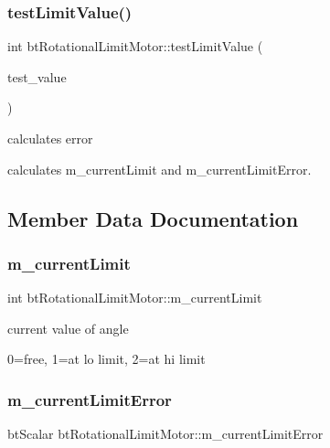 \subsubsection{\texorpdfstring{test\+Limit\+Value()}{testLimitValue()}\hspace{0.1cm}{\footnotesize\ttfamily [2/2]}}
{\footnotesize\ttfamily int bt\+Rotational\+Limit\+Motor\+::test\+Limit\+Value (\begin{DoxyParamCaption}\item[{bt\+Scalar}]{test\+\_\+value }\end{DoxyParamCaption})}



calculates error 

calculates m\+\_\+current\+Limit and m\+\_\+current\+Limit\+Error. 

\subsection{Member Data Documentation}
\mbox{\label{classbtRotationalLimitMotor_ad1e4fa6cb3ea2e4b78c96feab97448e8}} 
\subsubsection{\texorpdfstring{m\+\_\+current\+Limit}{m\_currentLimit}}
{\footnotesize\ttfamily int bt\+Rotational\+Limit\+Motor\+::m\+\_\+current\+Limit}



current value of angle 

0=free, 1=at lo limit, 2=at hi limit \mbox{\label{classbtRotationalLimitMotor_a7128feccb391176842f287b584e375d3}} 
\subsubsection{\texorpdfstring{m\+\_\+current\+Limit\+Error}{m\_currentLimitError}}
{\footnotesize\ttfamily bt\+Scalar bt\+Rotational\+Limit\+Motor\+::m\+\_\+current\+Limit\+Error}

